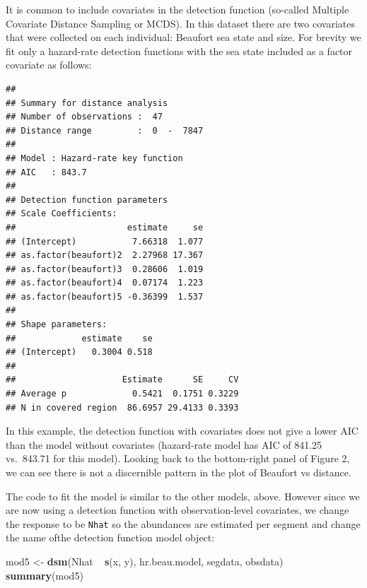\documentclass[]{article}
\newenvironment{Shaded}{}{}
\newcommand{\KeywordTok}[1]{\textcolor[rgb]{0.00,0.44,0.13}{\textbf{{#1}}}}
\newcommand{\DataTypeTok}[1]{\textcolor[rgb]{0.56,0.13,0.00}{{#1}}}
\newcommand{\StringTok}[1]{\textcolor[rgb]{0.25,0.44,0.63}{{#1}}}
\newcommand{\OtherTok}[1]{\textcolor[rgb]{0.00,0.44,0.13}{{#1}}}
\newcommand{\NormalTok}[1]{{#1}}
\begin{document}
It is common to include covariates in the detection function (so-called
Multiple Covariate Distance Sampling or MCDS). In this dataset there are
two covariates that were collected on each individual: Beaufort sea
state and size. For brevity we fit only a hazard-rate detection
functions with the sea state included as a factor covariate as follows:

\begin{Shaded}
\end{Shaded}

\begin{verbatim}
## 
## Summary for distance analysis 
## Number of observations :  47 
## Distance range         :  0  -  7847 
## 
## Model : Hazard-rate key function 
## AIC   : 843.7 
## 
## Detection function parameters
## Scale Coefficients:  
##                      estimate     se
## (Intercept)           7.66318  1.077
## as.factor(beaufort)2  2.27968 17.367
## as.factor(beaufort)3  0.28606  1.019
## as.factor(beaufort)4  0.07174  1.223
## as.factor(beaufort)5 -0.36399  1.537
## 
## Shape parameters:  
##             estimate    se
## (Intercept)   0.3004 0.518
## 
##                     Estimate      SE     CV
## Average p             0.5421  0.1751 0.3229
## N in covered region  86.6957 29.4133 0.3393
\end{verbatim}

In this example, the detection function with covariates does not give a
lower AIC than the model without covariates (hazard-rate model has AIC
of 841.25 vs.~843.71 for this model). Looking back to the bottom-right
panel of Figure 2, we can see there is not a discernible pattern in the
plot of Beaufort vs distance.

The code to fit the model is similar to the other models, above. However
since we are now using a detection function with observation-level
covariates, we change the response to be \texttt{Nhat} so the abundances
are estimated per segment and change the name ofthe detection function
model object:

\begin{Shaded}
\begin{Highlighting}[]
\NormalTok{mod5 <-}\StringTok{ }\KeywordTok{dsm}\NormalTok{(Nhat ~}\StringTok{ }\KeywordTok{s}\NormalTok{(x, y), hr.beau.model, segdata, obsdata)}
\KeywordTok{summary}\NormalTok{(mod5)}
\end{Highlighting}
\end{Shaded}
\end{document}
